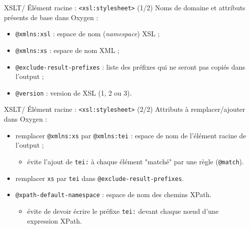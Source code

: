 \documentclass{beamer}
\begin{document}
        \begin{frame}{XSLT/ Élément racine : \texttt{<xsl:stylesheet>} (1/2)}
        \Large
        Noms de domaine et attributs présents de base dans Oxygen :
            \begin{itemize}
                \item \texttt{@xmlns:xsl} : espace de nom (\textit{namespace}) XSL ;
                \item \texttt{@xmlns:xs} : espace de nom XML ;
                \item \texttt{@exclude-result-prefixes} : liste des préfixes qui ne seront pas copiés dans l'output ;
                \item \texttt{@version} : version de XSL (1, 2 ou 3).
            \end{itemize}
        \end{frame}

        \begin{frame}{XSLT/ Élément racine : \texttt{<xsl:stylesheet>} (2/2)}
        \Large Attributs à remplacer/ajouter dans Oxygen :
            \begin{itemize}
                \item remplacer \texttt{@xmlns:xs} par \texttt{@xmlns:tei} : espace de nom de l'élément racine de l'output ;
                \begin{itemize}
                \large
                    \item évite l'ajout de \texttt{tei:} à chaque élément "matché" par une règle (\texttt{@match}).
                \end{itemize}
                \bigskip
                \item remplacer \texttt{xs} par \texttt{tei} dans \texttt{@exclude-result-prefixes}.
                \bigskip
                \item \texttt{@xpath-default-namespace} :  espace de nom des chemins XPath.
                \begin{itemize}
                \large
                    \item évite de devoir écrire le préfixe \texttt{tei:} devant chaque n\oe ud d'une expression XPath.
                \end{itemize}
            \end{itemize}
        \end{frame}
\end{document}
